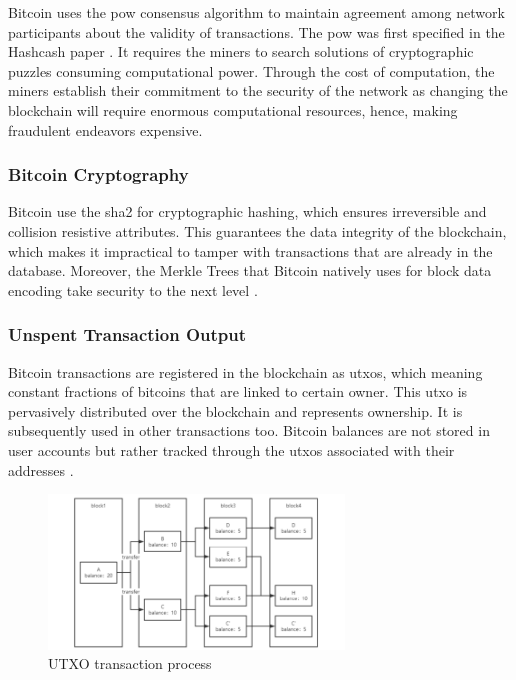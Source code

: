 Bitcoin uses the \gls{pow} consensus algorithm to maintain agreement among network participants about the validity of transactions. The \gls{pow} was first 
specified in the Hashcash paper \cite{9129332}. It requires the miners to search solutions of cryptographic puzzles consuming computational power. Through the cost of computation, the miners
establish their commitment to the security of the network as changing the blockchain will require enormous computational resources, hence, making fraudulent endeavors expensive.

\subsubsection{Bitcoin Cryptography}

Bitcoin use the \gls{sha2} for cryptographic hashing, which ensures irreversible and collision resistive attributes. This guarantees the data integrity of the 
blockchain, which makes it impractical to tamper with transactions that are already in the database. Moreover, the Merkle Trees that Bitcoin natively uses for block data 
encoding take security to the next level \cite{9129332}.

\subsubsection{Unspent Transaction Output} 

Bitcoin transactions are registered in the blockchain as \gls{utxo}s, which meaning constant fractions of bitcoins that are linked to certain owner. 
This \gls{utxo} is pervasively distributed over the blockchain and represents ownership. It is subsequently used in other transactions too. Bitcoin balances are not stored in user 
accounts but rather tracked through the \gls{utxo}s associated with their addresses \cite{bitcoincom}.

\begin{figure}[h]  
  \centering
  \includegraphics[width=0.7\textwidth]{Images/c2_3.png} 
  \caption{UTXO transaction process}
\end{figure}


